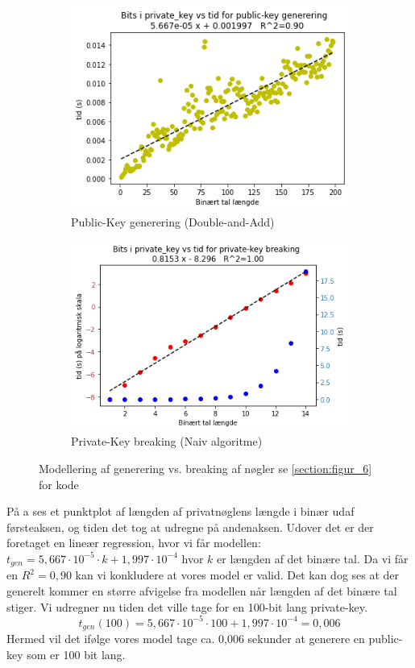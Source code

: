 \begin{figure}[htbp]
\centering
\begin{subfigure}{.5\textwidth}
  \centering
  \includegraphics[width=1.0\linewidth]{images/gen.png}
  \caption{Public-Key generering (Double-and-Add)}
  \label{fig:sub1}
\end{subfigure}%
\begin{subfigure}{.5\textwidth}
  \centering
  \includegraphics[width=1.0\linewidth]{images/breaking.png}
  \caption{Private-Key breaking (Naiv algoritme)}
  \label{fig:sub2}
\end{subfigure}
\caption{Modellering af generering vs. breaking af nøgler se \ref{section:figur_6} for kode}
\label{fig:genvsbreak}
\end{figure}

På a ses et punktplot af længden af privatnøglens længde i binær udaf førsteaksen, og tiden det tog at udregne på andenaksen. Udover det er der foretaget en lineær regression, hvor vi får modellen: $t_{gen}=5,667\cdot 10^{-5}\cdot k + 1,997\cdot 10^{-4}$ hvor $k$ er længden af det binære tal. Da vi får en $R^2=0,90$ kan vi konkludere at vores model er valid. Det kan dog ses at der generelt kommer en større afvigelse fra modellen når længden af det binære tal stiger. Vi udregner nu tiden det ville tage for en 100-bit lang private-key.
$$t_{gen} (100)=5,667\cdot 10^{-5}\cdot 100 + 1,997\cdot 10^{-4}=0,006$$
Hermed vil det ifølge vores model tage ca. 0,006 sekunder at generere en public-key som er 100 bit lang. 


